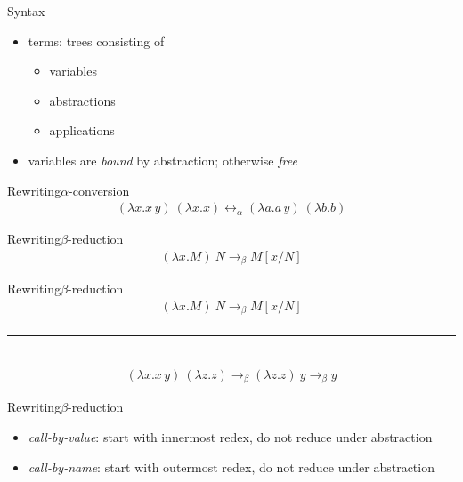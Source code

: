 \documentclass{beamer}
\newcommand{\hr}[0]{\rule{10.75cm}{0.4pt}\\}
\begin{document}
\begin{frame}{Syntax}
\begin{itemize}
\item terms: trees consisting of 
\begin{itemize}
\item variables
\item abstractions
\item applications
\end{itemize}
\item variables are \textit{bound} by abstraction; otherwise \textit{free}
\end{itemize}
\end{frame}
\begin{frame}{Rewriting}{$\alpha$-conversion}
\begin{align*}
(\lambda x.x\,y)\ (\lambda x.x)\longleftrightarrow_\alpha(\lambda a.a\,y)\ (\lambda b.b)
\end{align*}
\end{frame}
\begin{frame}{Rewriting}{$\beta$-reduction}
\begin{align*}
(\lambda x.M)\ N\longrightarrow_\beta M[x/N]
\end{align*}
\end{frame}
\begin{frame}{Rewriting}{$\beta$-reduction}
\begin{align*}
(\lambda x.M)\ N\longrightarrow_\beta M[x/N] \\
\end{align*}
\hr
\begin{align*}
(\lambda x.x\,y)\ (\lambda z.z)\longrightarrow_\beta(\lambda z.z)\ y\longrightarrow_\beta y
\end{align*}
\end{frame}
\begin{frame}{Rewriting}{$\beta$-reduction}
\begin{itemize}
\item \textit{call-by-value}: start with innermost redex, do not reduce under abstraction
\item \textit{call-by-name}: start with outermost redex, do not reduce under abstraction
\end{itemize}
\end{frame}
\end{document}
